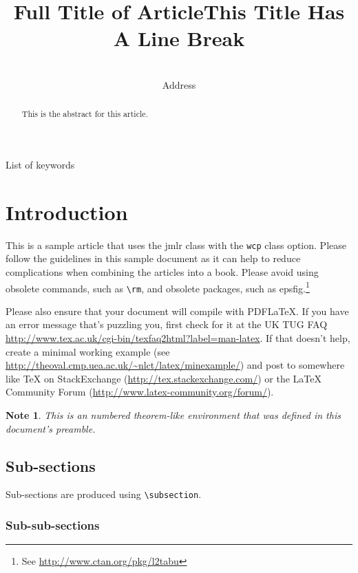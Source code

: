 \documentclass[pmlr]{jmlr}%
\title[Short Title]{Full Title of Article\titlebreak This Title Has
A Line Break\titletag{\thanks{sample footnote}}}
\author{\Name{Author Name1\nametag{\thanks{with a note}}} \Email{abc@sample.com}\and
   \Name{Author Name2} \Email{xyz@sample.com}\\
   \addr Address}
\newtheorem*{note}{Note}
\begin{document}
\maketitle

\begin{abstract}
This is the abstract for this article.
\end{abstract}
\begin{keywords}
List of keywords
\end{keywords}

\section{Introduction}
\label{sec:intro}

This is a sample article that uses the \textsf{jmlr} class with
the \texttt{wcp} class option.  Please follow the guidelines in
this sample document as it can help to reduce complications when
combining the articles into a book. Please avoid using obsolete
commands, such as \verb|\rm|, and obsolete packages, such as
\textsf{epsfig}.\footnote{See
\url{http://www.ctan.org/pkg/l2tabu}}

Please also ensure that your document will compile with PDF\LaTeX.
If you have an error message that's puzzling you, first check for it
at the UK TUG FAQ
\url{http://www.tex.ac.uk/cgi-bin/texfaq2html?label=man-latex}.  If
that doesn't help, create a minimal working example (see
\url{http://theoval.cmp.uea.ac.uk/~nlct/latex/minexample/}) and post
to somewhere like TeX on StackExchange
(\url{http://tex.stackexchange.com/}) or the LaTeX Community Forum
(\url{http://www.latex-community.org/forum/}).

\begin{note}
This is an numbered theorem-like environment that was defined in
this document's preamble.
\end{note}

\subsection{Sub-sections}

Sub-sections are produced using \verb|\subsection|.

\subsubsection{Sub-sub-sections}
\end{document}
